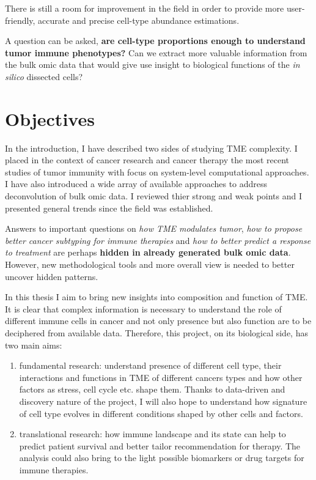 \documentclass[12pt,]{book}
\providecommand{\tightlist}{%
  \setlength{\itemsep}{0pt}\setlength{\parskip}{0pt}}
\theoremstyle{definition}
\theoremstyle{definition}
\theoremstyle{definition}
\theoremstyle{remark}
\begin{document}
There is still a room for improvement in the field in order to provide
more user-friendly, accurate and precise cell-type abundance
estimations.

A question can be asked, \textbf{are cell-type proportions enough to
understand tumor immune phenotypes?} Can we extract more valuable
information from the bulk omic data that would give use insight to
biological functions of the \emph{in silico} dissected cells?

\hypertarget{objectives}{%
\chapter*{Objectives}\label{objectives}}

In the introduction, I have described two sides of studying TME
complexity. I placed in the context of cancer research and cancer
therapy the most recent studies of tumor immunity with focus on
system-level computational approaches. I have also introduced a wide
array of available approaches to address deconvolution of bulk omic
data. I reviewed thier strong and weak points and I presented general
trends since the field was established.

Answers to important questions on \emph{how TME modulates tumor},
\emph{how to propose better cancer subtyping for immune therapies} and
\emph{how to better predict a response to treatment} are perhaps
\textbf{hidden in already generated bulk omic data}. However, new
methodological tools and more overall view is needed to better uncover
hidden patterns.

In this thesis I aim to bring new insights into composition and function
of TME. It is clear that complex information is necessary to understand
the role of different immune cells in cancer and not only presence but
also function are to be deciphered from available data. Therefore, this
project, on its biological side, has two main aims:

\begin{enumerate}
\def\labelenumi{\arabic{enumi}.}
\tightlist
\item
  fundamental research: understand presence of different cell type,
  their interactions and functions in TME of different cancers types and
  how other factors as stress, cell cycle etc. shape them. Thanks to
  data-driven and discovery nature of the project, I will also hope to
  understand how signature of cell type evolves in different conditions
  shaped by other cells and factors.
\item
  translational research: how immune landscape and its state can help to
  predict patient survival and better tailor recommendation for therapy.
  The analysis could also bring to the light possible biomarkers or drug
  targets for immune therapies.
\end{enumerate}
\end{document}
